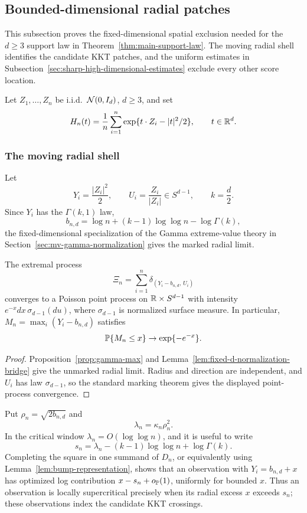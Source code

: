 \subsection{Bounded-dimensional radial patches}
\label{sec:fixed-d-patches}
\label{sec:sharp-high-dimensional-edge}

This subsection proves the fixed-dimensional spatial exclusion needed for the
\(d\ge3\) support law in Theorem~\ref{thm:main-support-law}. The moving radial
shell identifies the candidate KKT patches, and the uniform estimates in
Subsection~\ref{sec:sharp-high-dimensional-estimates} exclude every other
score location.

Let \(Z_1,\ldots,Z_n\) be i.i.d.\ \(\mathcal N(0,I_d)\), \(d\ge3\), and set
\[
    H_n(t)
    =
    \frac1n\sum_{i=1}^n
    \exp\{t\cdot Z_i-|t|^2/2\},
    \qquad t\in\mathbb R^d .
\]

\subsubsection{The moving radial shell}

Let
\[
    Y_i=\frac{|Z_i|^2}{2},\qquad U_i=\frac{Z_i}{|Z_i|}\in S^{d-1},
    \qquad k=\frac d2 .
\]
Since \(Y_i\) has the \(\Gamma(k,1)\) law,
\[
    b_{n,d}
    =
    \log n+(k-1)\log\log n-\log\Gamma(k),
\]
the fixed-dimensional specialization of the Gamma extreme-value theory in
Section~\ref{sec:mv-gamma-normalization} gives the marked radial limit.
\begin{lemma}
\label{lem:radial-gamma-extremes}
The extremal process
\[
    \Xi_n=\sum_{i=1}^n\delta_{(Y_i-b_{n,d},\,U_i)}
\]
converges to a Poisson point process on \(\mathbb R\times S^{d-1}\) with intensity
\(e^{-x}dx\,\sigma_{d-1}(du)\), where \(\sigma_{d-1}\) is normalized surface
measure.  In particular, \(M_n=\max_i(Y_i-b_{n,d})\) satisfies
\[
    \mathbb P\{M_n\le x\}\to\exp\{-e^{-x}\}.
\]
\end{lemma}

\begin{proof}
Proposition~\ref{prop:gamma-max} and
Lemma~\ref{lem:fixed-d-normalization-bridge} give the unmarked radial limit.
Radius and direction are independent, and \(U_i\) has law
\(\sigma_{d-1}\), so the standard marking theorem gives the displayed
point-process convergence.
\end{proof}

Put \(\rho_n=\sqrt{2b_{n,d}}\) and
\[
    \lambda_n=\kappa_n\rho_n^2 .
\]
In the critical window \(\lambda_n=O(\log\log n)\), and it is useful to write
\[
    s_n=\lambda_n-(k-1)\log\log n+\log\Gamma(k).
\]
Completing the square in one summand of \(D_n\), or equivalently using
Lemma~\ref{lem:bump-representation}, shows that an observation with
\(Y_i=b_{n,d}+x\) has optimized log contribution \(x-s_n+o_{\mathbb P}(1)\),
uniformly for bounded \(x\). Thus an observation is locally supercritical
precisely when its radial excess \(x\) exceeds \(s_n\); these observations
index the candidate KKT crossings.

